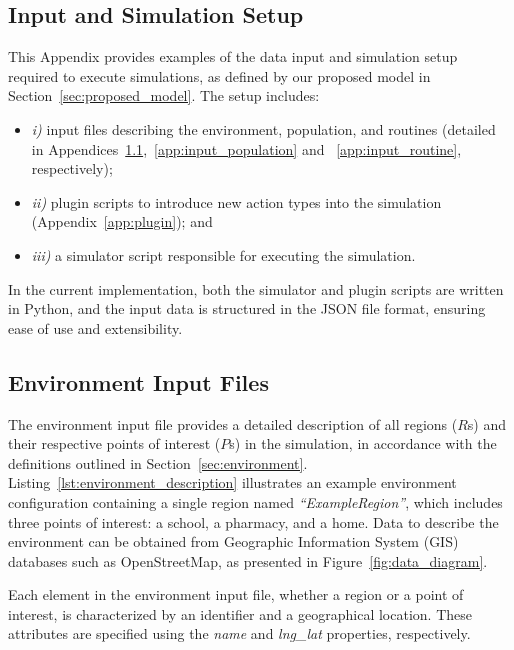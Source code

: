 \documentclass[pdflatex,sn-mathphys-num]{sn-jnl}%
\newcommand\red[1]{#1}
\theoremstyle{thmstyleone}%
\theoremstyle{thmstyletwo}%
\theoremstyle{thmstylethree}%
\begin{document}
\begin{appendices}

\section{Input and Simulation Setup}
\label{app:input}

This Appendix provides examples of the data input and simulation setup required to execute simulations, as defined by our proposed model in Section~\ref{sec:proposed_model}. The setup includes:
\begin{itemize}
    \item \textit{i)} input files describing the environment, population, and routines (detailed in Appendices~\ref{app:input_environment},~\ref{app:input_population} and ~\ref{app:input_routine}, respectively);
    \item \textit{ii)} plugin scripts to introduce new action types into the simulation (Appendix~\ref{app:plugin}); and
    \item \textit{iii)} a simulator script responsible for executing the simulation.
\end{itemize}
In the current implementation, both the simulator and plugin scripts are written in Python, and the input data is structured in the JSON file format, ensuring ease of use and extensibility.


\subsection{Environment Input Files}
\label{app:input_environment}
\red{The environment input file provides a detailed description of all regions ($R$s) and their respective points of interest ($P$s) in the simulation, in accordance with the definitions outlined in Section~\ref{sec:environment}. Listing~\ref{lst:environment_description} illustrates an example environment configuration containing a single region named \textit{``ExampleRegion''}, which includes three points of interest: a school, a pharmacy, and a home. Data to describe the environment can be obtained from Geographic Information System (GIS) databases such as OpenStreetMap, as presented in Figure~\ref{fig:data_diagram}.

Each element in the environment input file, whether a region or a point of interest, is characterized by an identifier and a geographical location. These attributes are specified using the \textit{name} and \textit{lng\_lat} properties, respectively.}


\end{appendices}
\end{document}
